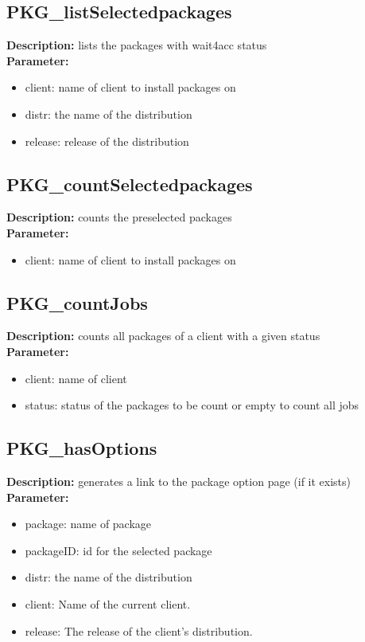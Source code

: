 \subsection{PKG\_listSelectedpackages}
\textbf{Description:} lists the packages with wait4acc status\\
\textbf{Parameter:}
\begin{itemize}
\item client: name of client to install packages on
\item distr: the name of the distribution
\item release: release of the distribution
\end{itemize}

\subsection{PKG\_countSelectedpackages}
\textbf{Description:} counts the preselected packages\\
\textbf{Parameter:}
\begin{itemize}
\item client: name of client to install packages on
\end{itemize}

\subsection{PKG\_countJobs}
\textbf{Description:} counts all packages of a client with a given status\\
\textbf{Parameter:}
\begin{itemize}
\item client: name of client
\item status: status of the packages to be count or empty to count all jobs
\end{itemize}

\subsection{PKG\_hasOptions}
\textbf{Description:} generates a link to the package option page (if it exists)\\
\textbf{Parameter:}
\begin{itemize}
\item package: name of package
\item packageID: id for the selected package
\item distr: the name of the distribution
\item client: Name of the current client.
\item release: The release of the client's distribution.
\end{itemize}

